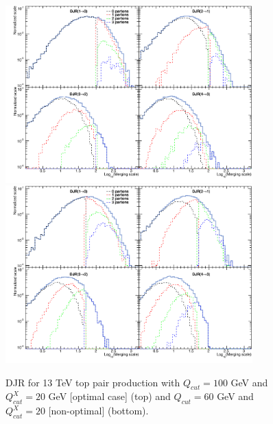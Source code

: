 \begin{figure}[!Hhtbp]
  \begin{center}
    \includegraphics[width=0.85\textwidth]{figs/DJR_q100_xq20_TTJets13TeV.png}
    \includegraphics[width=0.85\textwidth]{figs/DJR_q50_xq20_TTJets13TeV.png}
    \caption{DJR for 13 TeV top pair production with $Q_{cut}=100$ GeV and $Q^{X}_{cut}=20$ GeV [optimal case] (top) and $Q_{cut}=60$ GeV and $Q^{X}_{cut}=20$ [non-optimal] (bottom).}
    \label{fig:TTJetsMerging}
  \end{center}
\end{figure}

